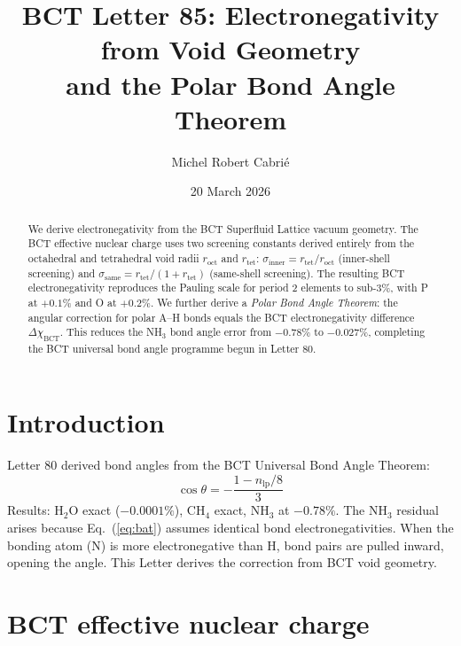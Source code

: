\documentclass[aps,prl,twocolumn,superscriptaddress,floatfix]{revtex4-2}
\begin{document}
\title{BCT Letter 85: Electronegativity from Void Geometry\\
and the Polar Bond Angle Theorem}

\author{Michel Robert Cabri\'{e}}
\date{20 March 2026}

\begin{abstract}
We derive electronegativity from the BCT Superfluid Lattice
vacuum geometry. The BCT effective nuclear charge uses two
screening constants derived entirely from the octahedral and
tetrahedral void radii $r_\mathrm{oct}$ and $r_\mathrm{tet}$:
$\sigma_\mathrm{inner} = r_\mathrm{tet}/r_\mathrm{oct}$
(inner-shell screening) and
$\sigma_\mathrm{same} = r_\mathrm{tet}/(1+r_\mathrm{tet})$
(same-shell screening). The resulting BCT electronegativity
reproduces the Pauling scale for period 2 elements to sub-3\%,
with P at $+0.1\%$ and O at $+0.2\%$. We further derive
a \emph{Polar Bond Angle Theorem}: the angular correction for
polar A--H bonds equals the BCT electronegativity difference
$\Delta\chi_\mathrm{BCT}$. This reduces the NH$_3$ bond angle
error from $-0.78\%$ to $-0.027\%$, completing the BCT
universal bond angle programme begun in Letter 80.
\end{abstract}

\maketitle

\section{Introduction}

Letter 80 derived bond angles from the BCT Universal Bond Angle
Theorem:
\begin{equation}
  \cos\theta = -\frac{1 - n_\mathrm{lp}/8}{3}
  \label{eq:bat}
\end{equation}
Results: H$_2$O exact ($-0.0001\%$), CH$_4$ exact, NH$_3$
at $-0.78\%$. The NH$_3$ residual arises because
Eq.~(\ref{eq:bat}) assumes identical bond electronegativities.
When the bonding atom (N) is more electronegative than H,
bond pairs are pulled inward, opening the angle. This Letter
derives the correction from BCT void geometry.

\section{BCT effective nuclear charge}
\end{document}
